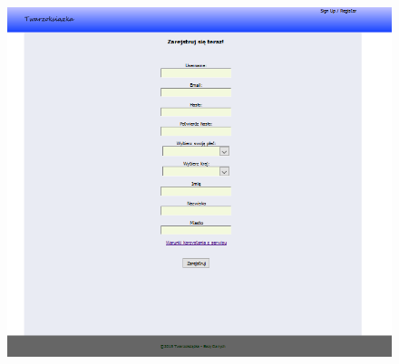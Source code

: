 \documentclass[a4paper,10pt,table]{article}
\begin{document}
\begin{figure}[h]
\begin{center}
\includegraphics[scale=0.6]{scrn/2}
\end{center}
\end{figure}
\end{document}
